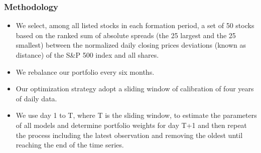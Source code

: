 \documentclass[pdf,10pt,xcolor=dvipsnames,hide notes]{beamer}
\begin{document}
\begin{frame}[label=frame4h]
	\frametitle{Methodology}
	
	\begin{itemize}
		\justifying
		
		
		\vspace{0.3cm}
		
		\item We select, among all listed stocks in	each formation period, a set of 50 stocks based on the ranked sum of absolute spreads (the 25 largest and the 25 smallest) between the normalized
		daily closing prices deviations (known as distance) of the
		S\&P 500 index and all shares.
		
%		
		
		\vspace{0.3cm}
		
		\item We rebalance our portfolio every six months.
		
		\vspace{0.3cm}
		
		\item Our optimization strategy adopt a sliding window of calibration of four years of daily data.
		
		\vspace{0.3cm}
		
		\item We use day 1 to T, where T is the sliding window, to
		estimate the parameters of all models and determine portfolio weights for
		day T+1 and then repeat the process including the latest observation and
		removing the oldest until reaching the end of the time series. 
%		
%		
%		
		
		\end{itemize}
	
\end{frame}
\end{document}
